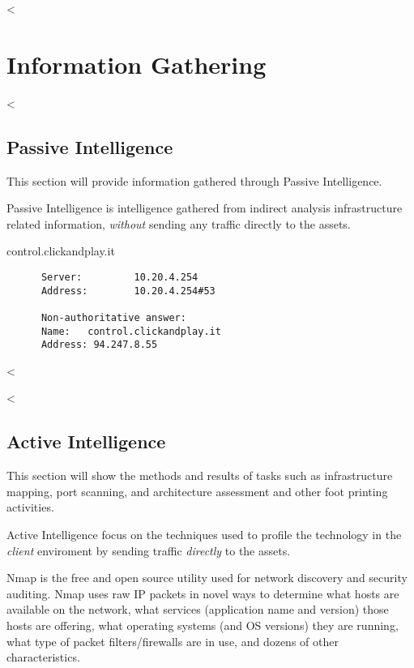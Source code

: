 

<%


\chapter{Information Gathering}\label{ch:infogath}

  <%

  \section {Passive Intelligence}\label{sec:passiveint}

    This section will provide information gathered through Passive Intelligence.

    Passive Intelligence is intelligence gathered from indirect analysis
    infrastructure related information, \textit{without} sending any traffic
    directly to the assets.

    control.clickandplay.it

    \begin{verbatim}
      Server:         10.20.4.254
      Address:        10.20.4.254#53

      Non-authoritative answer:
      Name:   control.clickandplay.it
      Address: 94.247.8.55
    \end{verbatim}

  <%

  <%

  \section {Active Intelligence}\label{sec:activeint}

    This section will show the methods and results of tasks such as
    infrastructure mapping, port scanning, and architecture assessment and other
    foot printing activities.

    Active Intelligence focus on the techniques used to profile the technology
    in the \textit{client} enviroment by sending traffic \textit{directly} to
    the assets.

    Nmap is the free and open source utility used for network discovery and
    security auditing. Nmap uses raw IP packets in novel ways to determine what
    hosts are available on the network, what services (application name and
    version) those hosts are offering, what operating systems (and OS versions)
    they are running, what type of packet filters/firewalls are in use, and
    dozens of other characteristics.

